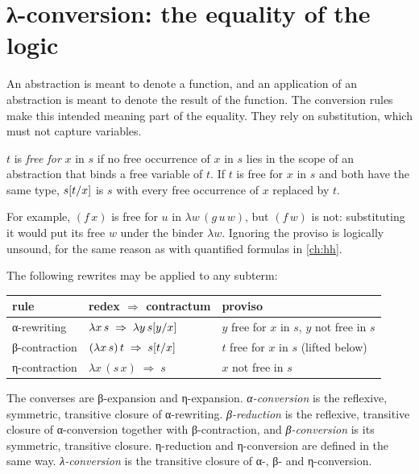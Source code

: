\section{λ-conversion: the equality of the logic}\label{sec:lambda-conversion}

An abstraction is meant to denote a function, and an application of an abstraction is meant to denote
the result of the function. The conversion rules make this intended meaning part of the equality.
They rely on substitution, which must not capture variables.

\begin{definition}\label{def:lambda-subst}
$t$ is \emph{free for} $x$ in $s$ if no free occurrence of $x$ in $s$ lies in the scope of an
abstraction that binds a free variable of $t$. If $t$ is free for $x$ in $s$ and both have the same
type, $s[t/x]$ is $s$ with every free occurrence of $x$ replaced by $t$.
\end{definition}
For example, $(f\,x)$ is free for $u$ in $\lambda w\,(g\,u\,w)$, but $(f\,w)$ is not: substituting it
would put its free $w$ under the binder $\lambda w$. Ignoring the proviso is logically unsound, for the
same reason as with quantified formulas in \cref{ch:hh}.

\begin{definition}\label{def:lambda-conv}
The following rewrites may be applied to any subterm:
\begin{center}
\begin{tabular}{@{}lll@{}}
\toprule
rule & redex $\Rightarrow$ contractum & proviso\\
\midrule
α-rewriting & $\lambda x\,s\;\Rightarrow\;\lambda y\,s[y/x]$ & $y$ free for $x$ in $s$, $y$ not free in $s$\\
β-contraction & $(\lambda x\,s)\,t\;\Rightarrow\;s[t/x]$ & $t$ free for $x$ in $s$ (lifted below)\\
η-contraction & $\lambda x\,(s\,x)\;\Rightarrow\;s$ & $x$ not free in $s$\\
\bottomrule
\end{tabular}
\end{center}
The converses are β-expansion and η-expansion. \emph{α-conversion} is the reflexive, symmetric,
transitive closure of α-rewriting. \emph{β-reduction} is the reflexive, transitive closure of
α-conversion together with β-contraction, and \emph{β-conversion} is its symmetric, transitive closure.
η-reduction and η-conversion are defined in the same way. \emph{λ-conversion} is the transitive
closure of α-, β- and η-conversion.
\end{definition}

